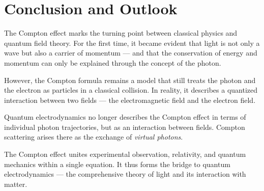 \section{Conclusion and Outlook}

The Compton effect marks the turning point between classical physics and quantum field theory.
For the first time, it became evident that light is not only a wave
but also a carrier of momentum —
and that the conservation of energy and momentum can only be explained
through the concept of the photon.

However, the Compton formula remains a model that still treats
the photon and the electron as particles in a classical collision.
In reality, it describes a quantized interaction
between two fields — the electromagnetic field and the electron field.

\begin{DidacticBox}
	Quantum electrodynamics no longer describes the Compton effect
	in terms of individual photon trajectories,
	but as an interaction between fields.
	Compton scattering arises there as the exchange of \emph{virtual photons}.
\end{DidacticBox}

The Compton effect unites experimental observation,
relativity, and quantum mechanics within a single equation.
It thus forms the bridge to quantum electrodynamics —
the comprehensive theory of light and its interaction with matter.
